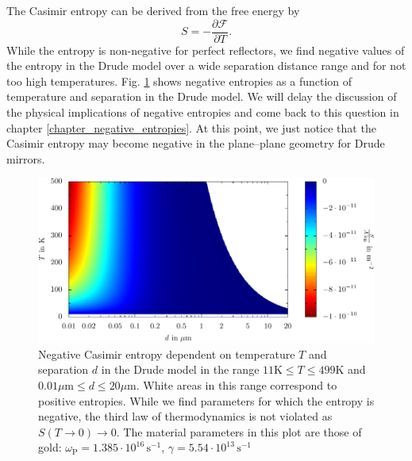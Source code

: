 The Casimir entropy can be derived from the free energy by
\begin{equation}
S = -\frac{\partial \mathcal{F}}{\partial T}.
\end{equation}
While the entropy is non-negative for perfect reflectors, we find negative
values of the entropy in the Drude model over a wide separation distance range
and for not too high temperatures. Fig. \ref{fig:scattering_pp_entropy} shows
negative entropies as a function of temperature and separation in the Drude
model. We will delay the discussion of the physical implications of negative
entropies and come back to this question in chapter
\ref{chapter_negative_entropies}. At this point, we just notice that the
Casimir entropy may become negative in the plane--plane geometry for Drude
mirrors.

\begin{figure}
\begin{center}
\includegraphics[scale=1]{plots/pp/entropy/plot.pdf}
\end{center}
\caption{Negative Casimir entropy dependent on temperature $T$ and separation
$d$ in the Drude model in the range $11\mathrm{K} \le T \le 499\mathrm{K}$ and
$0.01\mu\mathrm{m} \le d \le 20\mu\mathrm{m}$. White areas in this range
correspond to positive entropies. While we find parameters for which the
entropy is negative, the third law of thermodynamics is not violated as
$S(T\to0)\to0$. The material parameters in this plot are those of gold:
$\omega_\text{P}=1.385\cdot10^{16} \, \mathrm{s}^{-1}$,
$\gamma=5.54\cdot10^{13} \, \mathrm{s}^{-1}$}
\label{fig:scattering_pp_entropy}
\end{figure}
